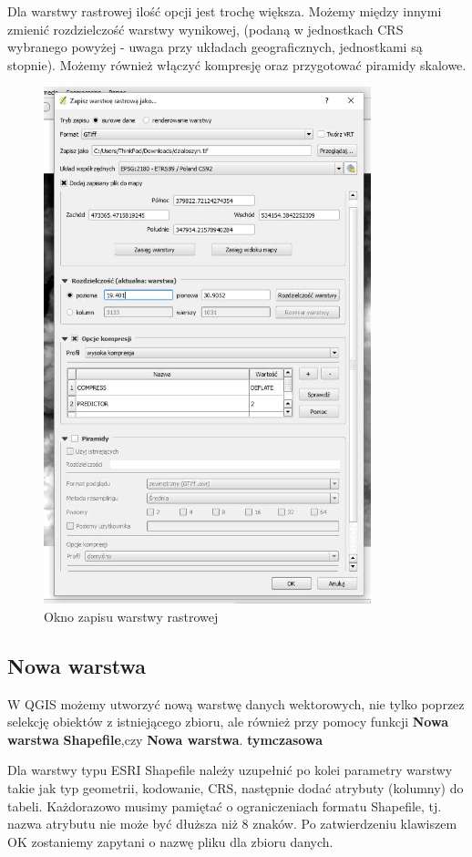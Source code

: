 \documentclass[12pt,a4paper]{book}
\begin{document}
Dla warstwy rastrowej ilość opcji jest trochę większa. Możemy między innymi zmienić rozdzielczość warstwy wynikowej, (podaną w jednostkach CRS wybranego powyżej - uwaga przy układach geograficznych, jednostkami są stopnie). Możemy również włączyć kompresję oraz przygotować piramidy skalowe.

\begin{figure}[ht]
	\centering
	\includegraphics[height=15cm]{002-zapisz-raster.png}
	\caption{Okno zapisu warstwy rastrowej}
\end{figure}


\subsection[Nowa warstwa]{Nowa warstwa}
W QGIS możemy utworzyć nową warstwę danych wektorowych, nie tylko poprzez
selekcję obiektów z istniejącego zbioru, ale również przy pomocy funkcji \textbf{Nowa warstwa} \textbf{Shapefile},czy \textbf{Nowa warstwa}.\textbf{ tymczasowa}

Dla warstwy typu ESRI Shapefile należy uzupełnić po kolei parametry warstwy takie jak typ geometrii, kodowanie, CRS, następnie dodać atrybuty (kolumny) do tabeli. Każdorazowo musimy pamiętać o ograniczeniach formatu Shapefile, tj. nazwa atrybutu nie może być dłuższa niż 8 znaków. Po zatwierdzeniu klawiszem OK zostaniemy zapytani o nazwę pliku dla zbioru danych.
\end{document}
